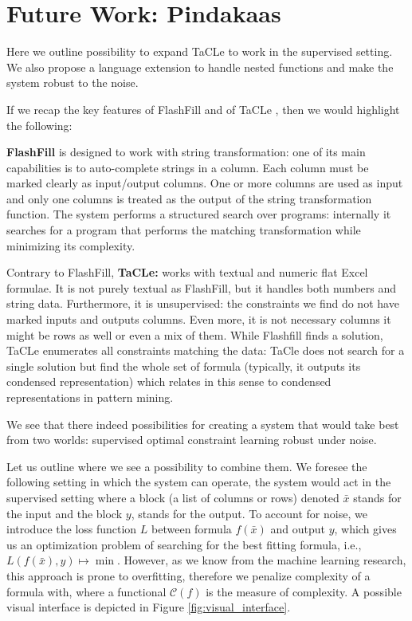 
\section{Future Work: Pindakaas}
Here we outline possibility to expand TaCLe to work in
the supervised setting. We also propose a language extension to
handle nested functions and make the system robust to the noise.

If we recap the key features of FlashFill \parencite{flashfill} and of TaCLe
\parencite{tacle}, then we would highlight the following:

\textbf{FlashFill} is designed to work with string transformation: one of its main capabilities is to
  auto-complete strings in a column. Each column must be marked clearly as input/output columns. One or more columns are used as
  input and only one columns is treated as the output of the string
  transformation function. The system performs a structured search over programs: internally it searches for a
  program that performs the matching transformation while minimizing its complexity.

Contrary to FlashFill, \textbf{TaCLe:} works with textual and numeric flat Excel formulae. It is not purely
    textual as FlashFill, but it handles both numbers and string data. Furthermore, it is unsupervised: the constraints we find do not have marked 
    inputs and outputs columns. Even more, it is not necessary columns it might be rows as well or even a mix of them.
  While Flashfill finds a solution, TaCLe enumerates all constraints matching the data: TaCle does not
    search for a single solution but find the whole set of formula
    (typically, it outputs its condensed representation) which relates in this sense to condensed representations in pattern mining.

We see that there indeed possibilities for creating a system that
would take best from two worlds: supervised optimal constraint
learning robust under noise.


Let us outline where we see a possibility to combine them. We foresee the following setting in which the system can operate, the system would act in the supervised setting where a block (a list of columns or rows) denoted $\bar x$ stands for the input and the block $y$, stands for the output. To account for noise, we introduce the loss function $L$ between formula $f(\bar x)$ and output $y$, which gives us an optimization problem of searching for the best fitting formula, i.e., $L(f(\bar x),y) \mapsto \min$. However, as we know from the machine learning research, this approach is prone to overfitting, therefore we penalize complexity of a formula with, where a functional $\mathcal{C}(f)$ is the measure of complexity. A possible visual interface is depicted in Figure \ref{fig:visual_interface}.


